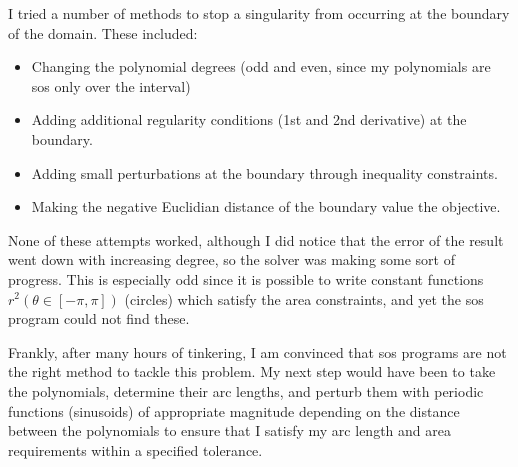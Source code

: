 I tried a number of methods to stop a singularity from occurring at the boundary of the domain.
These included:
\begin{itemize}
    \item Changing the polynomial degrees (odd and even, since my polynomials are
    \gls{sos} only over the interval)
    \item Adding additional regularity conditions (1st and 2nd derivative) at the boundary.
    \item Adding small perturbations at the boundary through inequality constraints.
    \item Making the negative Euclidian distance of the boundary value the objective.
\end{itemize}

None of these attempts worked, although I did notice that the error of the result went down with
increasing degree, so the solver was making some sort of progress.
This is especially odd since it is possible to write constant
functions $r^2(\theta \in [-\pi, \pi])$ (circles) which satisfy the area constraints,
and yet the \gls{sos} program could not find these.

Frankly, after many hours of tinkering, I am convinced that \gls{sos} programs are not the
right method to tackle this problem. My next step would have been to take
the polynomials, determine their arc lengths, and perturb them with periodic functions (sinusoids)
of appropriate magnitude depending on the distance between the polynomials to ensure that I satisfy
my arc length and area requirements within a specified tolerance.
